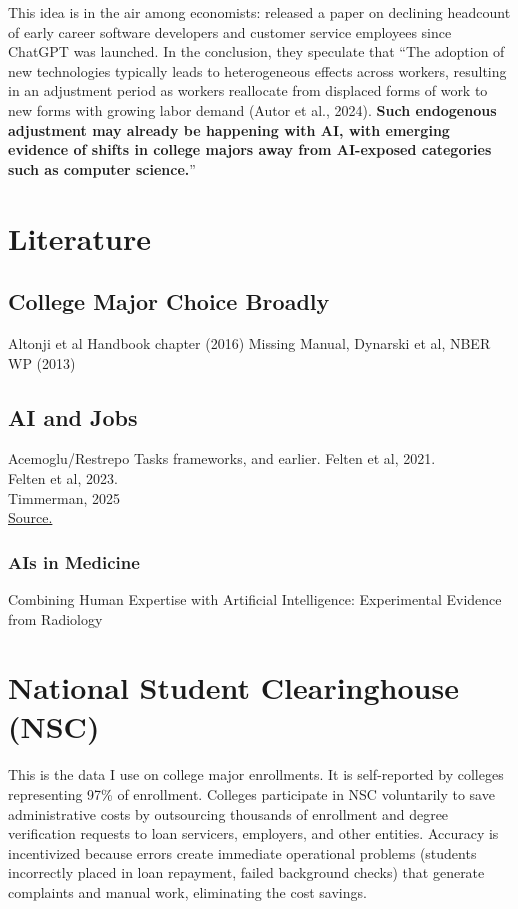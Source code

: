 \documentclass[12pt]{article}
\begin{document}
This idea is in the air among economists:  \citep{brynjolfsson2025canaries} released a paper on declining headcount of early career software developers and customer service employees since ChatGPT was launched.   In the conclusion, they speculate that ``The adoption of new technologies typically leads to heterogeneous effects across workers, resulting in an adjustment period as workers reallocate from displaced forms of work to new forms with growing labor demand (Autor et al., 2024). \textbf{ Such endogenous adjustment may already be happening with AI, with emerging evidence of shifts in college majors away from AI-exposed categories such
as computer science.}''
\section{Literature}

\subsection{College Major Choice Broadly}
Altonji et al Handbook chapter (2016)
Missing Manual, Dynarski et al, NBER WP (2013)
\subsection{AI and Jobs}
Acemoglu/Restrepo Tasks frameworks, and earlier. 
Felten et al, 2021. \\
Felten et al, 2023.   \\

Timmerman, 2025 \\ \href{https://www.federalreserve.gov/econres/notes/feds-notes/educational-exposure-to-generative-artificial-intelligence-20250226.html}{Source.}

\subsubsection{AIs in Medicine}
Combining Human Expertise with Artificial Intelligence:
Experimental Evidence from Radiology \\ 


\section{National Student Clearinghouse (NSC)}
This is the data I use on college major enrollments. It is self-reported by colleges representing 97\% of enrollment. Colleges participate in NSC voluntarily to save administrative costs by outsourcing thousands of enrollment and degree verification requests to loan servicers, employers, and other entities. Accuracy is incentivized because errors create immediate operational problems (students incorrectly placed in loan repayment, failed background checks) that generate complaints and manual work, eliminating the cost savings.\\
\end{document}
